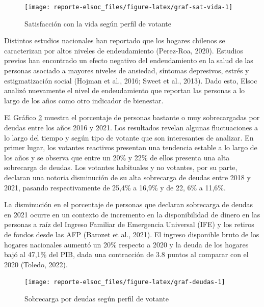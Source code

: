\documentclass[
  12pt,
]{book}
\begin{document}
\begin{figure}

{\centering \texttt{[image: reporte-elsoc\_files/figure-latex/graf-sat-vida-1]} 

}

\caption{Satisfacción con la vida según perfil de votante}\label{fig:graf-sat-vida}
\end{figure}

Distintos estudios nacionales han reportado que los hogares chilenos se caracterizan por altos niveles de endeudamiento (Perez-Roa, 2020). Estudios previos han encontrado un efecto negativo del endeudamiento en la salud de las personas asociado a mayores niveles de ansiedad, síntomas depresivos, estrés y estigmatización social (Hojman et al., 2016; Sweet et al., 2013). Dado esto, Elsoc analizó nuevamente el nivel de endeudamiento que reportan las personas a lo largo de los años como otro indicador de bienestar.

El Gráfico \ref{fig:graf-deudas} muestra el porcentaje de personas bastante o muy sobrecargadas por deudas entre los años 2016 y 2021. Los resultados revelan algunas fluctuaciones a lo largo del tiempo y según tipo de votante que son interesantes de analizar. En primer lugar, los votantes reactivos presentan una tendencia estable a lo largo de los años y se observa que entre un 20\% y 22\% de ellos presenta una alta sobrecarga de deudas. Los votantes habituales y no votantes, por su parte, declaran una notoria disminución de su alta sobrecarga de deudas entre 2018 y 2021, pasando respectivamente de 25,4\% a 16,9\% y de 22, 6\% a 11,6\%.

La disminución en el porcentaje de personas que declaran sobrecarga de deudas en 2021 ocurre en un contexto de incremento en la disponibilidad de dinero en las personas a raíz del Ingreso Familiar de Emergencia Universal (IFE) y los retiros de fondos desde las AFP (Barozet et al., 2021). El ingreso disponible bruto de los hogares nacionales aumentó un 20\% respecto a 2020 y la deuda de los hogares bajó al 47,1\% del PIB, dada una contracción de 3.8 puntos al comparar con el 2020 (Toledo, 2022).

\begin{figure}

{\centering \texttt{[image: reporte-elsoc\_files/figure-latex/graf-deudas-1]} 

}

\caption{Sobrecarga por deudas según perfil de votante}\label{fig:graf-deudas}
\end{figure}
\end{document}
